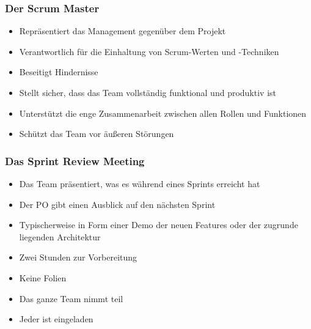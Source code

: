



\frame
{
  \frametitle{Der Scrum Master}
  \begin{itemize}
      \item{Repräsentiert das Management gegenüber dem Projekt}
      \item{Verantwortlich für die Einhaltung von Scrum-Werten und -Techniken}
      \item{Beseitigt Hindernisse}
      \item{Stellt sicher, dass das Team vollständig funktional und produktiv ist}
      \item{Unterstützt die enge Zusammenarbeit zwischen allen Rollen und Funktionen}
      \item{Schützt das Team vor äußeren Störungen}
  \end{itemize}
}


\frame
{
  \frametitle{Das Sprint Review Meeting}
  \begin{itemize}
      \item{Das Team präsentiert, was es während eines Sprints erreicht hat}
      \item{Der PO gibt einen Ausblick auf den nächsten Sprint}
      \item{Typischerweise in Form einer Demo der neuen Features oder der zugrunde liegenden Architektur}
      \item{Zwei Stunden zur Vorbereitung}
      \item{Keine Folien}
      \item{Das ganze Team nimmt teil}
      \item{Jeder ist eingeladen}
  \end{itemize}
}

